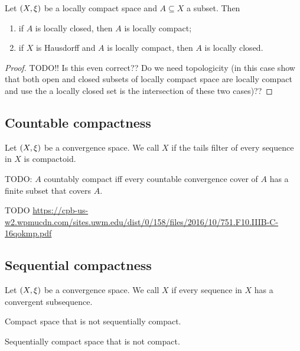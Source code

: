 \begin{proposition} \label{locallyCompactSubspace}
Let $\sSet{X,\xi}$ be a locally compact space and $A\subseteq X$ a subset. Then
\begin{enumerate}
\item if $A$ is locally closed, then $A$ is locally compact;
\item if $X$ is Hausdorff and $A$ is locally compact, then $A$ is locally closed.
\end{enumerate}
\end{proposition}
\begin{proof}
TODO!! Is this even correct?? Do we need topologicity (in this case show that both open and closed subsets of locally compact space are locally compact and use the a locally closed set is the intersection of these two cases)??
\end{proof}

\subsection{Countable compactness}
\begin{definition}
Let $\sSet{X,\xi}$ be a convergence space. We call $X$  if the tails filter of every sequence in $X$ is compactoid.
\end{definition}

\begin{proposition}
TODO: $A$ countably compact iff every countable convergence cover of $A$ has a finite subset that covers $A$.
\end{proposition}

TODO \url{https://cpb-us-w2.wpmucdn.com/sites.uwm.edu/dist/0/158/files/2016/10/751.F10.IIIB-C-16qokmp.pdf}

\subsection{Sequential compactness}
\begin{definition}
Let $\sSet{X,\xi}$ be a convergence space. We call $X$  if every sequence in $X$ has a convergent subsequence.
\end{definition}

\begin{example}
Compact space that is not sequentially compact.

Sequentially compact space that is not compact.
\end{example}



